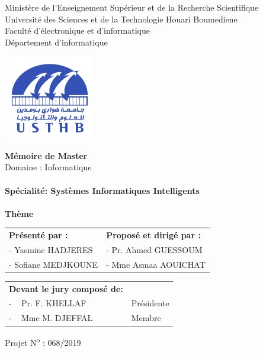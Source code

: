 \documentclass[12pt , a4paper]{report}
\begin{document}
\begin{center}
\normalsize{Ministère de l'Enseignement Supérieur et de la Recherche Scientifique}\\
\normalsize{Université des Sciences et de la Technologie Houari Boumediene}\\
\normalsize{Faculté d'électronique et d'informatique}\\
\normalsize{Département d'informatique}\\
\end{center}
\begin{center}
\includegraphics[width=4cm,height=3.7cm]{usthb.png}
\end{center}


\begin{center}
\Huge{\textbf{Mémoire de Master}}\\
\large{Domaine : Informatique}\\
\textbf{}\\
\large{\textbf{Spécialité: Systèmes Informatiques Intelligents}}\\
\textbf{}\\
\bigskip
\vspace*{1cm}
\normalsize{\textbf{Thème}}
\end{center}
\vspace*{1.5cm}

\begin{table}[h]
\center
\begin{tabular}{p{8cm}p{6.5cm}}
\textbf{Présenté par :} & \textbf{Proposé et dirigé par :}\\
- Yasmine HADJERES  & -	Pr. Ahmed GUESSOUM\\
- Sofiane MEDJKOUNE & - Mme Asmaa AOUICHAT\\
\end{tabular}
\end{table}

\vspace*{0.5cm}
\begin{table}[h]
\begin{tabular}{p{6.5cm}p{5cm}}
\textbf{Devant le jury composé de:}&\\
- \,\,\, Pr. F. KHELLAF & Présidente \\
- \,\,\, Mme M. DJEFFAL & Membre \\
\end{tabular}
\end{table}

\vspace*{2.3cm}
\begin{center}
Projet N\textsuperscript{o} : 068/2019
\end{center}
\end{document}
